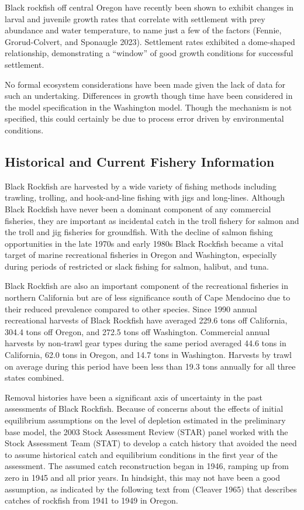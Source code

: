 \documentclass[11pt,
  english,
  letterpaper,
]{article}
\begin{document}
Black rockfish off central Oregon have recently been shown to exhibit changes in larval and juvenile growth rates that correlate with settlement with prey abundance and water temperature, to name just a few of the factors (Fennie, Grorud-Colvert, and Sponaugle 2023). Settlement rates exhibited a dome-shaped relationship, demonstrating a ``window'' of good growth conditions for successful settlement.

No formal ecosystem considerations have been made given the lack of data for such an undertaking. Differences in growth though time have been considered in the model specification in the Washington model. Though the mechanism is not specified, this could certainly be due to process error driven by environmental conditions.

\hypertarget{historical-and-current-fishery-information}{%
\subsection{Historical and Current Fishery Information}\label{historical-and-current-fishery-information}}

Black Rockfish are harvested by a wide variety of fishing methods including trawling, trolling, and hook-and-line fishing with jigs and long-lines. Although Black Rockfish have never been a dominant component of any commercial fisheries, they are important as incidental catch in the troll fishery for salmon and the troll and jig fisheries for groundfish. With the decline of salmon fishing opportunities in the late 1970s and early 1980s Black Rockfish became a vital target of marine recreational fisheries in Oregon and Washington, especially during periods of restricted or slack fishing for salmon, halibut, and tuna.

Black Rockfish are also an important component of the recreational fisheries in northern California but are of less significance south of Cape Mendocino due to their reduced prevalence compared to other species. Since 1990 annual recreational harvests of Black Rockfish have averaged 229.6 tons off California, 304.4 tons off Oregon, and 272.5 tons off Washington. Commercial annual harvests by non-trawl gear types during the same period averaged 44.6 tons in California, 62.0 tons in Oregon, and 14.7 tons in Washington. Harvests by trawl on average during this period have been less than 19.3 tons annually for all three states combined.

Removal histories have been a significant axis of uncertainty in the past assessments of Black Rockfish. Because of concerns about the effects of initial equilibrium assumptions on the level of depletion estimated in the preliminary base model, the 2003 Stock Assessment Review (STAR) panel worked with the Stock Assessment Team (STAT) to develop a catch history that avoided the need to assume historical catch and equilibrium conditions in the first year of the assessment. The assumed catch reconstruction began in 1946, ramping up from zero in 1945 and all prior years. In hindsight, this may not have been a good assumption, as indicated by the following text from (Cleaver 1965) that describes catches of rockfish from 1941 to 1949 in Oregon.
\end{document}
